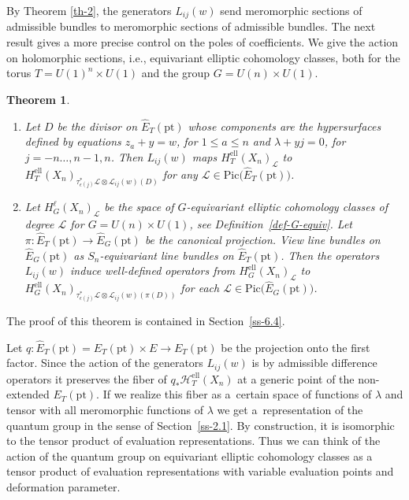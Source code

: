 \documentclass[pdftex]{sigma}
\numberwithin{equation}{section}
\newtheorem{Theorem}{Theorem}[section]
\begin{document}
By Theorem \ref{th-2}, the generators $L_{ij}(w)$ send meromorphic sections of admissible bundles to meromorphic sections of admissible bundles. The next result gives a more precise control on the poles of coefficients. We give the action on holomorphic sections, i.e., equivariant elliptic cohomology classes, both for the torus $T=U(1)^n\times U(1)$ and the group $G=U(n)\times U(1)$.

\begin{Theorem}\label{th-3}\quad
\begin{enumerate}\itemsep=0pt
\item[$(i)$] Let $D$ be the divisor on $\hat E_T(\mathrm{pt})$ whose components are the hypersurfaces defined by equations $z_a+y=w$, for $1\leq a\leq n$ and $\lambda+yj=0$, for $j=-n\dots,n-1,n$. Then $L_{ij}(w)$ maps $H^{\mathrm{ell}}_T(X_n)_{\mathcal L}$ to $H^{\mathrm{ell}}_T(X_n)_{\tau_{\epsilon(j)}^*\mathcal L\otimes \mathcal L_{ij}(w)(D)}$ for any $\mathcal L\in\mathrm{Pic}\big(\hat E_T(\mathrm{pt})\big)$.
\item[$(ii)$] Let $H^{\ell}_G(X_n)_{\mathcal L}$ be the space of $G$-equivariant elliptic cohomology classes of degree $\mathcal L$ for $G=U(n)\times U(1)$, see Definition~{\rm \ref{def-G-equiv}}. Let $\pi\colon \hat E_T(\mathrm{pt})\to \hat E_G(\mathrm{pt})$ be the canonical projection. View line bundles on $\hat E_G(\mathrm{pt})$ as $S_n$-equivariant line bundles on $\hat E_T(\mathrm{pt})$. Then the opera\-tors~$L_{ij}(w)$ induce well-defined operators from $H^{\mathrm{ell}}_G(X_n)_{\mathcal L}$ to $H^{\mathrm{ell}}_G(X_n)_{\tau_{\epsilon(j)}^*\mathcal L\otimes \mathcal L_{ij}(w)(\pi(D))}$ for each $\mathcal L\in\mathrm{Pic}\big(\hat E_G(\mathrm{pt})\big)$.
\end{enumerate}
\end{Theorem}
The proof of this theorem is contained in Section~\ref{ss-6.4}.
\begin{Remark} Let $q\colon\hat E_T(\mathrm{pt})=E_T(\mathrm{pt})\times E\to E_T(\mathrm{pt})$ be the projection onto the first factor. Since the action of the generators $L_{ij}(w)$ is by admissible difference operators it preserves the fiber of $q_*\mathcal H_T^{\mathrm{ell}}(X_n)$ at a generic point of the non-extended $E_T(\mathrm{pt})$. If we realize this fiber as a~certain space of functions of $\lambda$ and tensor with all meromorphic functions of $\lambda$ we get a~representation of the quantum group in the sense of Section~\ref{ss-2.1}. By construction, it is isomorphic to the tensor product of evaluation representations. Thus we can think of the action of the quantum group on equivariant elliptic cohomology classes as a tensor product of evaluation representations with variable evaluation points and deformation parameter.
\end{Remark}
\end{document}
